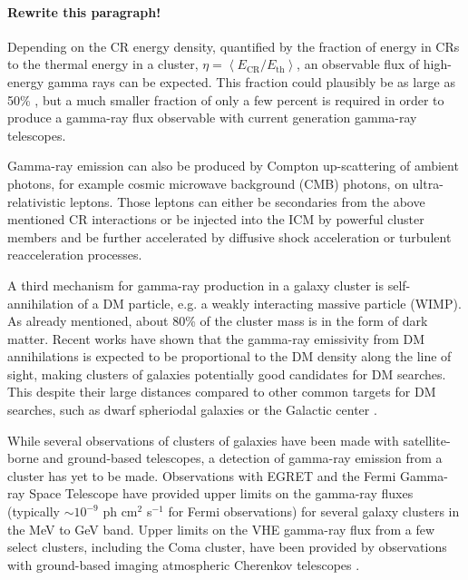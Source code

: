 \documentclass[12pt,manuscript]{aastex}
\newcommand{\expval}[1]{\left\langle #1 \right\rangle}
\begin{document}
\paragraph{Rewrite this paragraph!}
Depending on the CR energy density, quantified by the fraction of energy in CRs to the thermal energy in a cluster, $\eta=\expval{ E_{\mathrm{CR}}/E_{\mathrm{th}}}$, an observable flux of high-energy gamma rays can be expected. This fraction could plausibly be as large as 50\% \citep{article:Ryu_etal:2003}, but a much smaller fraction of only a few percent is required in order to produce a gamma-ray flux observable with current generation gamma-ray telescopes. 

Gamma-ray emission can also be produced by Compton up-scattering of ambient photons, for example cosmic microwave background (CMB) photons, on ultra-relativistic leptons. Those leptons can either be secondaries from the above mentioned CR interactions or be injected into the ICM by powerful cluster members and be further accelerated by diffusive shock acceleration or turbulent reacceleration processes.

A third mechanism for gamma-ray production in a galaxy cluster is self-annihilation of a DM particle, e.g. a weakly interacting massive particle (WIMP). As already mentioned, about 80\% of the cluster mass is in the form of dark matter. Recent works \citep{article:EvansFerrerSarkar:2004, article:BergstromHooper:2006} have shown that the gamma-ray emissivity from DM annihilations is expected to be proportional to the DM density along the line of sight, making clusters of galaxies potentially good candidates for DM searches. This despite their large distances compared to other common targets for DM searches, such as dwarf spheriodal galaxies \citep{article:Strigari_etal:2007, article:Acciari_etal:2010, article:Aliu_etal:2009} or the Galactic center \citep{article:Kosack_etal:2004, article:Aharonian_etal:2006, article:Aharonian_etal:2009b}.  

While several observations of clusters of galaxies have been made with satellite-borne and ground-based telescopes, a detection of gamma-ray emission from a cluster has yet to be made.  Observations with EGRET \citep{article:Sreekumar_etal:1996, article:Reimer_etal:2003} and the Fermi Gamma-ray Space Telescope \citep{article:Ackermann_etal:2010} have provided upper limits on the gamma-ray fluxes (typically $\sim10^{-9}$ ph cm$^{2}$ s$^{-1}$ for Fermi observations) for several galaxy clusters in the MeV to GeV band. Upper limits on the VHE gamma-ray flux from a few select clusters, including the Coma cluster, have been provided by observations with ground-based imaging atmospheric Cherenkov telescopes \citep[IACTs;][]{article:Perkins_etal:2006, inproc:Perkins_etal:2008, article:Aharonian_etal:2009a, article:Aleksic_etal:2010}.
\end{document}
